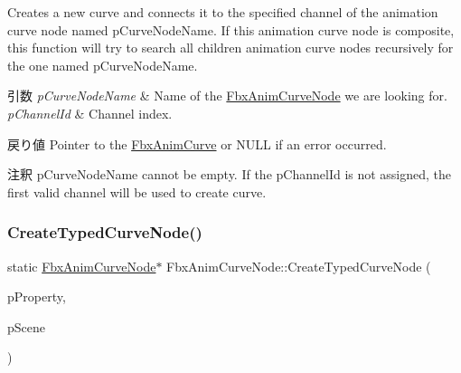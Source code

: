 Creates a new curve and connects it to the specified channel of the animation curve node named p\+Curve\+Node\+Name. If this animation curve node is composite, this function will try to search all children animation curve nodes recursively for the one named p\+Curve\+Node\+Name. 
\begin{DoxyParams}{引数}
{\em p\+Curve\+Node\+Name} & Name of the \hyperlink{class_fbx_anim_curve_node}{Fbx\+Anim\+Curve\+Node} we are looking for. \\
\hline
{\em p\+Channel\+Id} & Channel index. \\
\hline
\end{DoxyParams}
\begin{DoxyReturn}{戻り値}
Pointer to the \hyperlink{class_fbx_anim_curve}{Fbx\+Anim\+Curve} or N\+U\+LL if an error occurred. 
\end{DoxyReturn}
\begin{DoxyRemark}{注釈}
p\+Curve\+Node\+Name cannot be empty. If the p\+Channel\+Id is not assigned, the first valid channel will be used to create curve. 
\end{DoxyRemark}
\mbox{\label{class_fbx_anim_curve_node_a588814e5973e080f84c54438623ddf7e}} 
\subsubsection{\texorpdfstring{Create\+Typed\+Curve\+Node()}{CreateTypedCurveNode()}}
{\footnotesize\ttfamily static \hyperlink{class_fbx_anim_curve_node}{Fbx\+Anim\+Curve\+Node}$\ast$ Fbx\+Anim\+Curve\+Node\+::\+Create\+Typed\+Curve\+Node (\begin{DoxyParamCaption}\item[{\hyperlink{class_fbx_property}{Fbx\+Property} \&}]{p\+Property,  }\item[{\hyperlink{class_fbx_scene}{Fbx\+Scene} $\ast$}]{p\+Scene }\end{DoxyParamCaption})\hspace{0.3cm}{\ttfamily [static]}}

